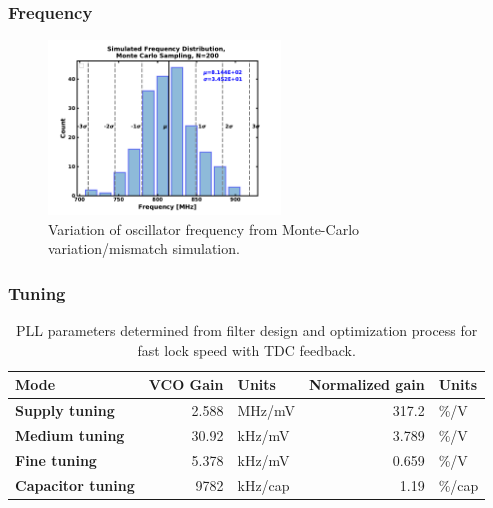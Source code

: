 	\subsubsection{Frequency}
		\begin{figure}[htb!]
	        \centering
	        \includegraphics[width=0.55\textwidth, angle=0]{./figs/results/freq_pdf}
		    \caption{Variation of oscillator frequency from Monte-Carlo variation/mismatch simulation.}
		    \label{fig:freq_variation}
		\end{figure}
	\FloatBarrier
	\subsubsection{Tuning}
		\begin{table}[h!]
			\centering
			\def\arraystretch{1.5}		
			\setlength\arrayrulewidth{0.75pt}
			\setlength{\tabcolsep}{1em} %
			\begin{tabular}{|l|r|l|r|l|}
				\hline 
				\rule[-1ex]{0pt}{2.5ex} \cellcolor{gray!40}\textbf{Mode} & \cellcolor{gray!40}\textbf{VCO Gain} & \cellcolor{gray!40}\textbf{Units} & \cellcolor{gray!40}\textbf{Normalized gain}& \cellcolor{gray!40}\textbf{Units}\\ 
				\hline 
				\rule[-1ex]{0pt}{2.5ex} \textbf{Supply tuning}  & 2.588 & MHz/mV & 317.2 &\%/V\\
				\hline 
				\rule[-1ex]{0pt}{2.5ex} \textbf{Medium tuning}  & 30.92 & kHz/mV  & 3.789 &\%/V\\
				\hline 
				\rule[-1ex]{0pt}{2.5ex} \textbf{Fine tuning}  & 5.378 & kHz/mV & 0.659 & \%/V\\
				\hline 
				\rule[-1ex]{0pt}{2.5ex} \textbf{Capacitor tuning} & 9782 & kHz/cap & 1.19 & \%/cap\\
				\hline 
			\end{tabular} 
			\caption{PLL parameters determined from filter design and optimization process for fast lock speed with TDC feedback.}
			\label{tab:vco_gains}
		\end{table} 

